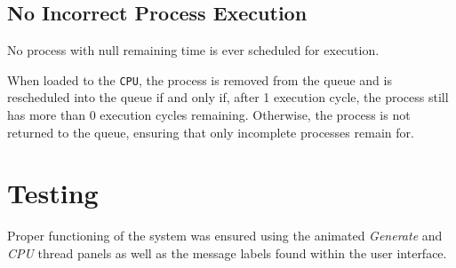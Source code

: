 \documentclass[]{report}
\begin{document}
\vspace{2mm}

\subsection*{No Incorrect Process Execution}
No process with null remaining time is ever scheduled for execution. \par 
When loaded to the \verb|CPU|, the process is removed from the queue and is rescheduled into the queue if and only if, after 1 execution cycle, the process still has more than 0 execution cycles remaining. Otherwise, the process is not returned to the queue, ensuring that only incomplete processes remain for.

\vspace{2mm}

\section*{Testing}
Proper functioning of the system was ensured using the animated \textit{Generate} and \textit{CPU} thread panels as well as the message labels found within the user interface. 
\end{document}
